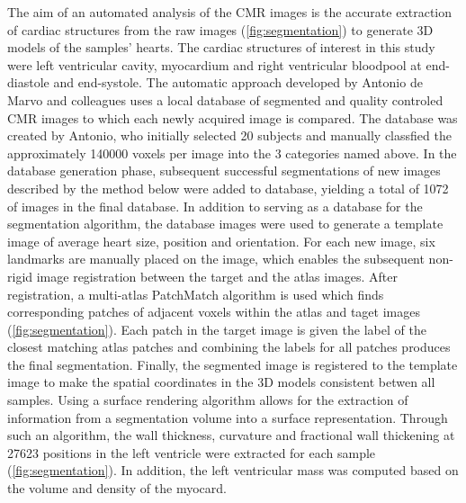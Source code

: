 The aim of an automated analysis of the CMR images is the accurate extraction of cardiac structures from the raw images (\cref{fig:segmentation}) to generate 3D models of the samples' hearts. The cardiac structures of interest in this study were left ventricular cavity, myocardium and right ventricular bloodpool at end-diastole and end-systole. The automatic approach developed by Antonio de Marvo and colleagues uses a local database of segmented and quality controled CMR images to which each newly acquired image is compared. The database was created by Antonio, who initially selected \num{20} subjects and manually classfied the approximately \num{140000} voxels per image into the \num{3} categories named above. In the database generation phase, subsequent successful segmentations of new images described by the method below were added to database, yielding a total of \num{1072} of images in the final database. In addition to serving as a database for the segmentation algorithm, the database images were used to generate a template image of average heart size, position and orientation. For each new image, six landmarks are manually placed on the image, which enables the subsequent non-rigid image registration between the target and the atlas images. After registration, a multi-atlas PatchMatch algorithm is used which finds corresponding patches of adjacent voxels within the atlas and taget images (\cref{fig:segmentation}). Each patch in the target image is given the label of the closest matching atlas patches and combining the labels for all patches produces the final segmentation. Finally, the segmented image is registered to the template image to make the spatial coordinates in the 3D models consistent betwen all samples.  Using a surface rendering algorithm allows for the extraction of information from a segmentation volume into a surface representation. Through such an algorithm, the wall thickness, curvature and  fractional wall thickening at \num{27623} positions in the left ventricle were extracted for each sample (\cref{fig:segmentation}). In addition, the left ventricular mass was computed based on the volume and density of the myocard. 
\\

